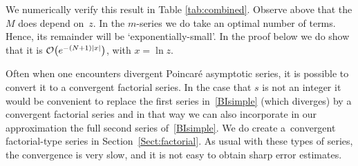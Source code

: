 \documentclass[11pt]{article}
\numberwithin{equation}{section}
\numberwithin{equation}{section}
\def\expe{{\rm e}}
\def\bigO{{\mathcal O}}
\begin{document}
 We numerically verify this result in Table \ref{tab:combined}.
Observe above that the $M$ does depend on~$z$. In the $m$-series we do take an optimal
number of terms. Hence, its remainder will be `exponentially-small'.
In the proof below we do show that it is $\bigO\bigl(\expe^{-(N+1)|x|}\bigr)$,
with $x=\ln z$.

Often when one encounters divergent Poincar\'e asymptotic series, it is possible to convert it
to a convergent factorial series. In the case that $s$ is not an integer it would be convenient
to replace the first series in~\eqref{BIsimple} (which diverges) by a convergent factorial
series and in that way we can also incorporate in our approximation the full second series
of~\eqref{BIsimple}. We do create a~convergent factorial-type series in
Section~\ref{Sect:factorial}. As usual with these types of series, the convergence is very slow, and
it is not easy to obtain sharp error estimates.
\end{document}
